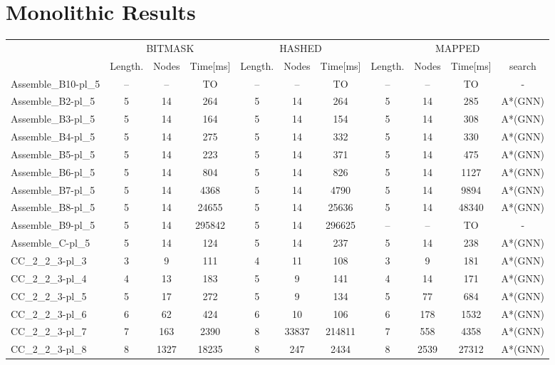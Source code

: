 \documentclass{article}
\newcommand{\planLength}{Length.}
\newcommand{\nodesExp}{Nodes}
\newcommand{\solvingTime}{Time}
\newcommand{\unsolvedColumn}{--}
\newcommand{\myTO}{TO}
\begin{document}
\section*{Monolithic Results}
\begin{longtable}[!ht]{l|ccc|ccc|cccc}
\centering
\multirow2{*}{\textbf{Instance Name}} & \multicolumn{3}{c|}{BITMASK} & \multicolumn{3}{c|}{HASHED} & \multicolumn{4}{c}{MAPPED} \\
\cline{2-11}
& \planLength & \nodesExp & \solvingTime [ms] & \planLength & \nodesExp & \solvingTime [ms] & \planLength & \nodesExp & \solvingTime [ms] & search \\
\hline
Assemble\_B10-pl\_5 & \unsolvedColumn & \unsolvedColumn & \myTO & \unsolvedColumn & \unsolvedColumn & \myTO & \unsolvedColumn & \unsolvedColumn & \myTO & - \\
Assemble\_B2-pl\_5 & 5 & 14 & 264 & 5 & 14 & 264 & 5 & 14 & 285 & A*(GNN) \\
Assemble\_B3-pl\_5 & 5 & 14 & 164 & 5 & 14 & 154 & 5 & 14 & 308 & A*(GNN) \\
Assemble\_B4-pl\_5 & 5 & 14 & 275 & 5 & 14 & 332 & 5 & 14 & 330 & A*(GNN) \\
Assemble\_B5-pl\_5 & 5 & 14 & 223 & 5 & 14 & 371 & 5 & 14 & 475 & A*(GNN) \\
Assemble\_B6-pl\_5 & 5 & 14 & 804 & 5 & 14 & 826 & 5 & 14 & 1127 & A*(GNN) \\
Assemble\_B7-pl\_5 & 5 & 14 & 4368 & 5 & 14 & 4790 & 5 & 14 & 9894 & A*(GNN) \\
Assemble\_B8-pl\_5 & 5 & 14 & 24655 & 5 & 14 & 25636 & 5 & 14 & 48340 & A*(GNN) \\
Assemble\_B9-pl\_5 & 5 & 14 & 295842 & 5 & 14 & 296625 & \unsolvedColumn & \unsolvedColumn & \myTO & - \\
Assemble\_C-pl\_5 & 5 & 14 & 124 & 5 & 14 & 237 & 5 & 14 & 238 & A*(GNN) \\
CC\_2\_2\_3-pl\_3 & 3 & 9 & 111 & 4 & 11 & 108 & 3 & 9 & 181 & A*(GNN) \\
CC\_2\_2\_3-pl\_4 & 4 & 13 & 183 & 5 & 9 & 141 & 4 & 14 & 171 & A*(GNN) \\
CC\_2\_2\_3-pl\_5 & 5 & 17 & 272 & 5 & 9 & 134 & 5 & 77 & 684 & A*(GNN) \\
CC\_2\_2\_3-pl\_6 & 6 & 62 & 424 & 6 & 10 & 106 & 6 & 178 & 1532 & A*(GNN) \\
CC\_2\_2\_3-pl\_7 & 7 & 163 & 2390 & 8 & 33837 & 214811 & 7 & 558 & 4358 & A*(GNN) \\
CC\_2\_2\_3-pl\_8 & 8 & 1327 & 18235 & 8 & 247 & 2434 & 8 & 2539 & 27312 & A*(GNN) \\

\end{longtable}
\end{document}
